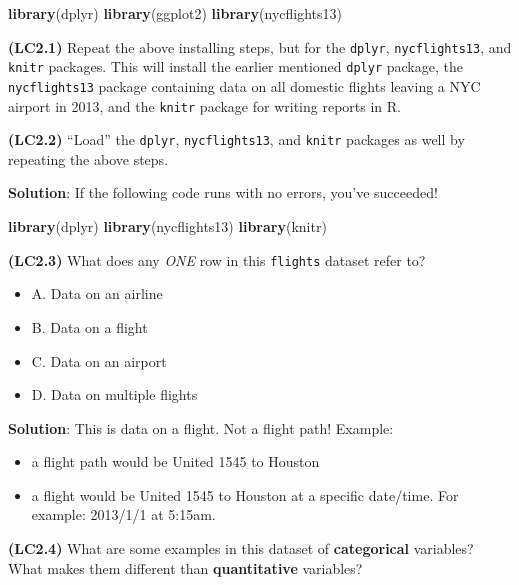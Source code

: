 \documentclass[12pt, krantz2,]{krantz}
\makeatletter
\newenvironment{Shaded}{\begin{snugshade}}{\end{snugshade}}
\newcommand{\KeywordTok}[1]{\textcolor[rgb]{0.27,0.27,0.27}{\textbf{#1}}}
\newcommand{\NormalTok}[1]{#1}
\providecommand{\tightlist}{%
  \setlength{\itemsep}{0pt}\setlength{\parskip}{0pt}}
\newenvironment{kframe}{%
\medskip{}
\setlength{\fboxsep}{.8em}
 \def\at@end@of@kframe{}%
 \ifinner\ifhmode%
  \def\at@end@of@kframe{\end{minipage}}%
  \begin{minipage}{\columnwidth}%
 \fi\fi%
 \def\FrameCommand##1{\hskip\@totalleftmargin \hskip-\fboxsep
 \colorbox{shadecolor}{##1}\hskip-\fboxsep
     \hskip-\linewidth \hskip-\@totalleftmargin \hskip\columnwidth}%
 \MakeFramed {\advance\hsize-\width
   \@totalleftmargin\z@ \linewidth\hsize
   \@setminipage}}%
 {\par\unskip\endMakeFramed%
 \at@end@of@kframe}
\renewenvironment{Shaded}{\begin{kframe}}{\end{kframe}}
\makeatother
\begin{document}
\begin{Shaded}
\begin{Highlighting}[]
\KeywordTok{library}\NormalTok{(dplyr)}
\KeywordTok{library}\NormalTok{(ggplot2)}
\KeywordTok{library}\NormalTok{(nycflights13)}
\end{Highlighting}
\end{Shaded}

\textbf{(LC2.1)} Repeat the above installing steps, but for the \texttt{dplyr}, \texttt{nycflights13}, and \texttt{knitr} packages. This will install the earlier mentioned \texttt{dplyr} package, the \texttt{nycflights13} package containing data on all domestic flights leaving a NYC airport in 2013, and the \texttt{knitr} package for writing reports in R.

\textbf{(LC2.2)} ``Load'' the \texttt{dplyr}, \texttt{nycflights13}, and \texttt{knitr} packages as well by repeating the above steps.

\textbf{Solution}: If the following code runs with no errors, you've succeeded!

\begin{Shaded}
\begin{Highlighting}[]
\KeywordTok{library}\NormalTok{(dplyr)}
\KeywordTok{library}\NormalTok{(nycflights13)}
\KeywordTok{library}\NormalTok{(knitr)}
\end{Highlighting}
\end{Shaded}

\textbf{(LC2.3)} What does any \emph{ONE} row in this \texttt{flights} dataset refer to?

\begin{itemize}
\tightlist
\item
  A. Data on an airline
\item
  B. Data on a flight
\item
  C. Data on an airport
\item
  D. Data on multiple flights
\end{itemize}

\textbf{Solution}: This is data on a flight. Not a flight path! Example:

\begin{itemize}
\tightlist
\item
  a flight path would be United 1545 to Houston
\item
  a flight would be United 1545 to Houston at a specific date/time. For example: 2013/1/1 at 5:15am.
\end{itemize}

\textbf{(LC2.4)} What are some examples in this dataset of \textbf{categorical} variables? What makes them different than \textbf{quantitative} variables?
\end{document}
